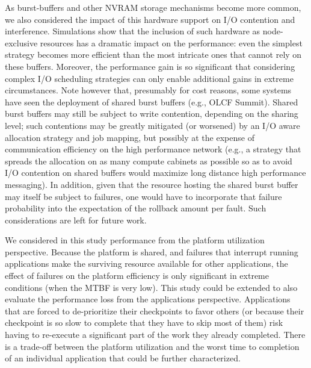 \documentclass[two]{article}
\begin{document}
As burst-buffers and other NVRAM storage mechanisms become more
common, we also considered the impact of this hardware support on I/O
contention and interference. Simulations show that the inclusion of
such hardware as node-exclusive resources has a dramatic impact on the performance: even the
simplest strategy becomes more efficient than the most intricate ones
that cannot rely on these buffers. Moreover,
the performance gain is so significant that considering complex I/O
scheduling strategies can only enable additional gains in extreme
circumstances.
 Note however that, presumably for cost reasons, 
some systems have seen the deployment 
of shared burst buffers (e.g., OLCF Summit). Shared burst buffers 
may still be subject to write contention, depending on the sharing level; 
such contentions may be greatly mitigated (or worsened) by an I/O aware 
allocation strategy and job mapping, but possibly at the expense of 
communication efficiency on the high performance network (e.g., a strategy 
that spreads the allocation on as many compute cabinets as possible so as to 
avoid I/O contention on shared buffers would maximize long distance high 
performance messaging). In addition, given that the resource hosting the 
shared burst buffer may itself be subject to failures, one would have to
incorporate that failure probability into the expectation of the 
rollback amount per fault. Such considerations are left for future work.

We considered in this study performance from the platform utilization
perspective. Because the platform is shared, and failures that
interrupt running applications make the surviving resource available
for other applications, the effect of failures on the platform
efficiency is only significant in extreme conditions (when the MTBF is
very low). This study could be extended to also evaluate the
performance loss from the applications perspective. Applications that
are forced to de-prioritize their checkpoints to favor others (or
because their checkpoint is so slow to complete that they have to skip
most of them) risk having to re-execute a significant part of the work
they already completed. There is a trade-off between the platform
utilization and the worst time to completion of an individual application that
could be further characterized.
\end{document}
